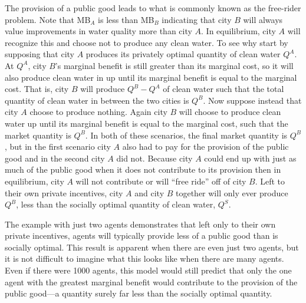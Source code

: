 The provision of a public good leads to what is commonly known as the free-rider problem. Note that MB$_A$ is less than MB$_B$ indicating that city $B$ will always value improvements in water quality more than city $A$. In equilibrium, city $A$ will recognize this and choose not to produce any clean water. To see why start by supposing that city $A$ produces its privately optimal quantity of clean water $Q^A$. At $Q^A$, city $B$'s marginal benefit is still greater than its marginal cost, so it will also produce clean water in up until its marginal benefit is equal to the marginal cost. That is, city $B$ will produce $Q^B - Q^A$ of clean water such that the total quantity of clean water in between the two cities is $Q^B$. Now suppose instead that city $A$ choose to produce nothing. Again city $B$ will choose to produce clean water up until its marginal benefit is equal to the marginal cost, such that the market quantity is $Q^B$. In both of these scenarios, the final market quantity is $Q^B$, but in the first scenario city $A$ also had to pay for the provision of the public good and in the second city $A$ did not. Because city $A$ could end up with just as much of the public good when it does not contribute to its provision then in equilibrium, city $A$ will not contribute or will ``free ride'' off of city $B$. Left to their own private incentives, city $A$ and city $B$ together will only ever produce $Q^B$, less than the socially optimal quantity of clean water, $Q^S$. 

The example with just two agents demonstrates that left only to their own private incentives, agents will typically provide less of a public good than is socially optimal. This result is apparent when there are even just two agents, but it is not difficult to imagine what this looks like when there are many agents. Even if there were 1000 agents, this model would still predict that only the one agent with the greatest marginal benefit would contribute to the provision of the public good---a quantity surely far less than the socially optimal quantity. 


